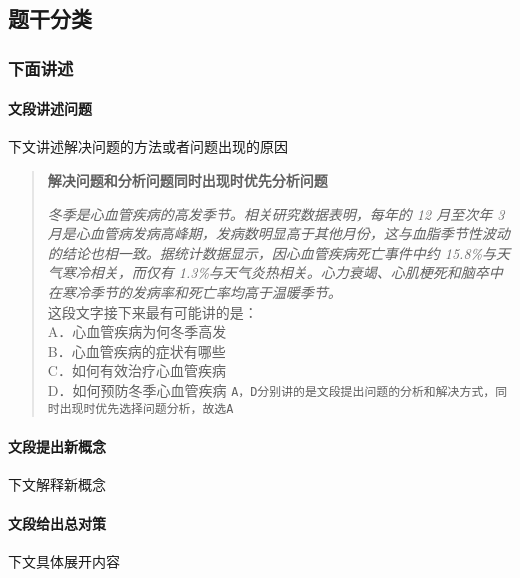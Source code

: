 \subsection{题干分类}

\subsubsection{下面讲述}

\paragraph{文段讲述问题} 下文讲述解决问题的方法或者问题出现的原因
\begin{quote}
	\textbf{解决问题和分析问题同时出现时优先分析问题}
	\begin{tcolorbox}[colback=blue!5, colframe=blue!75!black, title=文段讲述问题案例]
		\textit{冬季是心血管疾病的高发季节。相关研究数据表明，每年的 12 月至次年 3 月是心血管病发病高峰期，发病数明显高于其他月份，这与血脂季节性波动的结论也相一致。据统计数据显示，因心血管疾病死亡事件中约 15.8\%与天气寒冷相关，而仅有 1.3\%与天气炎热相关。心力衰竭、心肌梗死和脑卒中在寒冷季节的发病率和死亡率均高于温暖季节。}\\
		这段文字接下来最有可能讲的是：\\
		A．心血管疾病为何冬季高发\\
		B．心血管疾病的症状有哪些\\
		C．如何有效治疗心血管疾病\\
		D．如何预防冬季心血管疾病
		\tcblower%
		\texttt{A，D分别讲的是文段提出问题的分析和解决方式，同时出现时优先选择问题分析，故选A}
	\end{tcolorbox}
\end{quote}

\paragraph{文段提出新概念} 下文解释新概念
\paragraph{文段给出总对策} 下文具体展开内容
